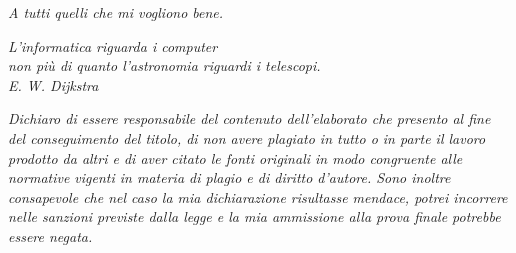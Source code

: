 \vspace*{5cm}
\begin{flushright}
    \textit{A tutti quelli che mi vogliono bene.}
\end{flushright}
\vspace{2cm}
\begin{flushright}
	\textit{L'informatica riguarda i computer\\
		non più di quanto l'astronomia riguardi i telescopi.\\
		E. W. Dijkstra}\\
\end{flushright}
\vspace{11cm}
\textit{Dichiaro di essere responsabile del contenuto dell’elaborato che presento al fine del
	conseguimento del titolo, di non avere plagiato in tutto o in parte il lavoro prodotto
	da altri e di aver citato le fonti originali in modo congruente alle normative vigenti in
	materia di plagio e di diritto d’autore. Sono inoltre consapevole che nel caso la mia
	dichiarazione risultasse mendace, potrei incorrere nelle sanzioni previste dalla legge e
	la mia ammissione alla prova finale potrebbe essere negata.}
\restoregeometry

